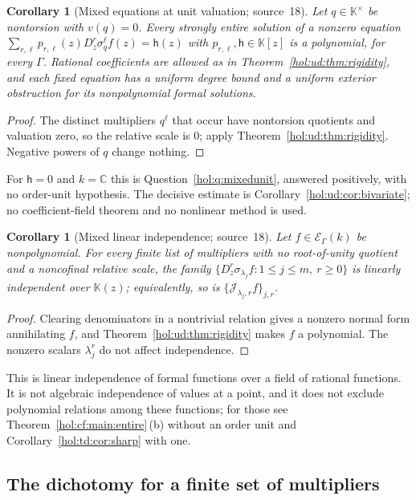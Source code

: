 \documentclass[11pt]{article}
\numberwithin{equation}{section}
\newtheorem{corollary}[theorem]{Corollary}
\theoremstyle{definition}
\theoremstyle{remark}
\newcommand{\C}{\mathbb C}
\newcommand{\KK}{\mathbb K}
\newcommand{\EK}{\mathcal E_\Gamma(k)}
\newcommand{\jet}[2]{\mathcal J_{#1,#2}}
\begin{document}
\begin{corollary}[Mixed equations at unit valuation; source~18]
\label{hol:ud:cor:unitrigidity}
Let $q\in\KK^\times$ be nontorsion with $v(q)=0$. Every strongly entire
solution of a nonzero equation
$\sum_{r,\ell}p_{r,\ell}(z)D_z^r\sigma_q^\ell f(z)=\mathsf h(z)$ with
$p_{r,\ell},\mathsf h\in\KK[z]$ is a polynomial, for every $\Gamma$. Rational
coefficients are allowed as in Theorem~\ref{hol:ud:thm:rigidity}, and each
fixed equation has a uniform degree bound and a uniform exterior obstruction
for its nonpolynomial formal solutions.
\end{corollary}

\begin{proof}
The distinct multipliers $q^\ell$ that occur have nontorsion quotients and
valuation zero, so the relative scale is $0$; apply
Theorem~\ref{hol:ud:thm:rigidity}. Negative powers of $q$ change nothing.
\end{proof}

For $\mathsf h=0$ and $k=\C$ this is Question~\ref{hol:q:mixedunit}, answered
positively, with no order-unit hypothesis. The decisive estimate is
Corollary~\ref{hol:ud:cor:bivariate}; no coefficient-field theorem and no
nonlinear method is used.

\begin{corollary}[Mixed linear independence; source~18]
\label{hol:ud:cor:linind}
Let $f\in\EK$ be nonpolynomial. For every finite list of multipliers with no
root-of-unity quotient and a noncofinal relative scale, the family
$\{D_z^r\sigma_{\lambda_j}f:1\le j\le m,\ r\ge0\}$ is linearly independent over
$\KK(z)$; equivalently, so is $\{\jet{\lambda_j}rf\}_{j,r}$.
\end{corollary}

\begin{proof}
Clearing denominators in a nontrivial relation gives a nonzero normal form
annihilating $f$, and Theorem~\ref{hol:ud:thm:rigidity} makes $f$ a
polynomial. The nonzero scalars $\lambda_j^r$ do not affect independence.
\end{proof}

This is linear independence of formal functions over a field of rational
functions. It is not algebraic independence of values at a point, and it does
not exclude polynomial relations among these functions; for those see
Theorem~\ref{hol:cf:main:entire}\,(b) without an order unit and
Corollary~\ref{hol:td:cor:sharp} with one.

\subsection{The dichotomy for a finite set of multipliers}
\label{hol:ud:sub:dichotomy}
\end{document}
